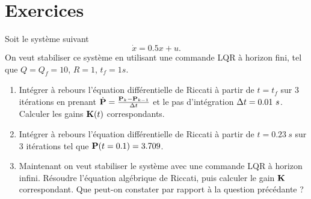 \newpage
\section{Exercices}
\begin{exercise}
	Soit le système suivant 
	\begin{equation}
	\dot{x} = 0.5x + u .
	\end{equation}
	On veut stabiliser ce système en utilisant une commande LQR à horizon fini, tel que $Q=Q_f=10$, $R=1$, $t_f = 1s$.
	\begin{enumerate}
		\item Intégrer à rebours l'équation différentielle de Riccati à partir de $t=t_f$ sur 3 itérations en prenant $\boldmath{\dot{\mathbf{P}}}=\frac{\mathbf{P}_{k}-\mathbf{P}_{k-1}}{\Delta t}$ et le pas d'intégration $\Delta t = 0.01~s$. Calculer les gains $\mathbf{K}(t)$ correspondants.
		\item Intégrer à rebours l'équation différentielle de Riccati à partir de $t=0.23~s$ sur 3 itérations tel que $\mathbf{P}(t=0.1)=3.709$. 
		\item Maintenant on veut stabiliser le système avec une commande LQR à horizon infini. Résoudre l'équation algébrique de Riccati, puis calculer le gain $\mathbf{K}$ correspondant. Que peut-on constater par rapport à la question précédante ?
	\end{enumerate}
\end{exercise}
